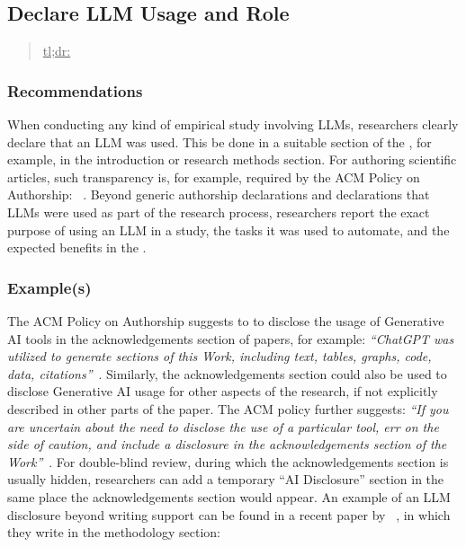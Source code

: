



\subsection{Declare LLM Usage and Role}
\label{sec:declare-llm-usage-and-role}

\begin{quote}
\underline{tl;dr:}  
\end{quote}

\subsubsection{Recommendations}

When conducting any kind of empirical study involving LLMs, researchers \must clearly declare that an LLM was used.
This \should be done in a suitable section of the \paper, for example, in the introduction or research methods section.
For authoring scientific articles, such transparency is, for example, required by the ACM Policy on Authorship: ~\cite{ACM2023}.
Beyond generic authorship declarations and declarations that LLMs were used as part of the research process, researchers \should report the exact purpose of using an LLM in a study, the tasks it was used to automate, and the expected benefits in the \paper.

\subsubsection{Example(s)}

The ACM Policy on Authorship suggests to to disclose the usage of Generative AI tools in the acknowledgements section of papers, for example: \emph{``ChatGPT was utilized to generate sections of this Work, including text, tables, graphs, code, data, citations''}~\cite{ACM2023}. 
Similarly, the acknowledgements section could also be used to disclose Generative AI usage for other aspects of the research, if not explicitly described in other parts of the paper.
The ACM policy further suggests: \emph{``If you are uncertain about the need to disclose the use of a particular tool, err on the side of caution, and include a disclosure in the acknowledgements section of the Work''}~\cite{ACM2023}.
For double-blind review, during which the acknowledgements section is usually hidden, researchers can add a temporary ``AI Disclosure'' section in the same place the acknowledgements section would appear. 
An example of an LLM disclosure beyond writing support can be found in a recent paper by \citeauthor{DBLP:conf/re/LubosFTGMEL24}~\cite{DBLP:conf/re/LubosFTGMEL24}, in which they write in the methodology section:

